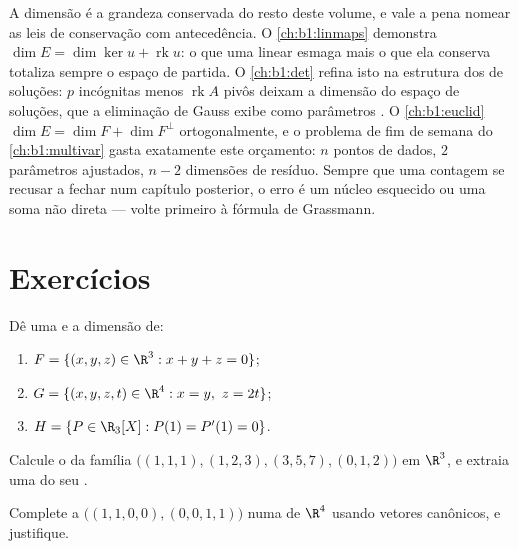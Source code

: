\begin{remark}
\label{rem:b1:findim:perspectives}
A dimensão é a grandeza conservada do resto deste volume, e vale a
pena nomear as leis de conservação com antecedência.
O \cref{ch:b1:linmaps} demonstra $\dim E = \dim\ker u +
\operatorname{rk} u$: o que uma  linear esmaga mais o
que ela conserva totaliza sempre o espaço de partida. O \cref{ch:b1:det}
refina isto na estrutura dos  de soluções: $p$ incógnitas
menos $\operatorname{rk} A$ pivôs deixam a dimensão do espaço de soluções, que a
eliminação de Gauss exibe como parâmetros . O \cref{ch:b1:euclid} 
$\dim E = \dim F + \dim
F^\perp$ ortogonalmente, e o problema de fim de semana do \cref{ch:b1:multivar} gasta
exatamente este orçamento: $n$ pontos de dados, $2$ parâmetros
ajustados, $n - 2$ dimensões de resíduo. Sempre que uma contagem se
recusar a fechar num capítulo posterior, o erro é um núcleo
esquecido ou uma soma não direta --- volte primeiro à fórmula de
Grassmann.
\end{remark}

\section{Exercícios}

\begin{exercise}[$\star$]\label{exo:b1:findim:1}
Dê uma  e a dimensão de:
\begin{enumerate}
  \item $F = \{(x,y,z) \in \R^3 : x + y + z = 0\}$;
  \item $G = \{(x,y,z,t) \in \R^4 : x = y,\ z = 2t\}$;
  \item $H = \{P \in \R_3[X] : P(1) = P'(1) = 0\}$.
\end{enumerate}
\end{exercise}

\begin{exercise}[$\star$]\label{exo:b1:findim:2}
Calcule o  da família
$\bigl((1,1,1), (1,2,3), (3,5,7), (0,1,2)\bigr)$ em $\R^3$, e extraia
uma  do seu .
\end{exercise}

\begin{exercise}[$\star$]\label{exo:b1:findim:3}
Complete a  $\bigl((1,1,0,0), (0,0,1,1)\bigr)$ numa  de $\R^4$ usando vetores
canônicos, e justifique.
\end{exercise}

